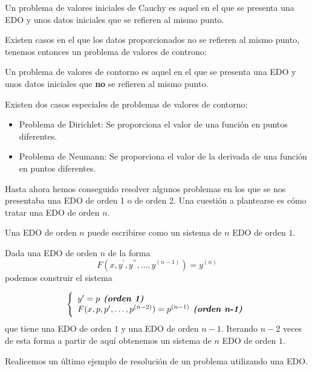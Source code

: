 \documentclass{mathnotes}
\begin{document}
\begin{definition}
Un problema de valores iniciales de Cauchy es aquel en el que se presenta una EDO y unos datos iniciales que se refieren al mismo punto.
\end{definition}

Existen casos en el que los datos proporcionados no se refieren al mismo punto, tenemos entonces un problema de valores de controno: 

\begin{definition}
Un problema de valores de contorno es aquel en el que se presenta una EDO y unos datos iniciales que \textbf{no} se refieren al mismo punto.
\end{definition}

Existen dos casos especiales de problemas de valores de contorno:
\begin{itemize}
\item Problema de Dirichlet: Se proporciona el valor de una función en puntos diferentes.
\item Problema de Neumann: Se proporciona el valor de la derivada de una función en puntos diferentes.
\end{itemize}

Hasta ahora hemos conseguido resolver algunos problemas en los que se nos presentaba una EDO de orden 1 o de orden 2. Una cuestión a plantearse es cómo tratar una EDO de orden $n$.

\obs
Una EDO de orden $n$ puede escribirse como un sistema de $n$ EDO de orden $1$.

Dada una EDO de orden $n$ de la forma $$F(x,y^\prime,y^{\prime\prime},\hdots, y^{(n-1)}) = y^{(n)}$$ podemos construir el sistema

\begin{equation*}
  \left\lbrace
  \begin{array}{l}
     y^\prime=p \textit{\textbf{ (orden 1)}}\\
     F(x,p,p^\prime,\hdots, p^{(n-2)}) = p^{(n-1)} \textit{\textbf{ (orden n-1)}}\\
  \end{array}
  \right.
\end{equation*}
que tiene una EDO de orden $1$ y una EDO de orden $n-1$. Iterando $n-2$ veces de esta forma a partir de aquí obtenemos un sistema de $n$ EDO de orden $1$.


Realicemos un último ejemplo de resolución de un problema utilizando una EDO.
\end{document}
